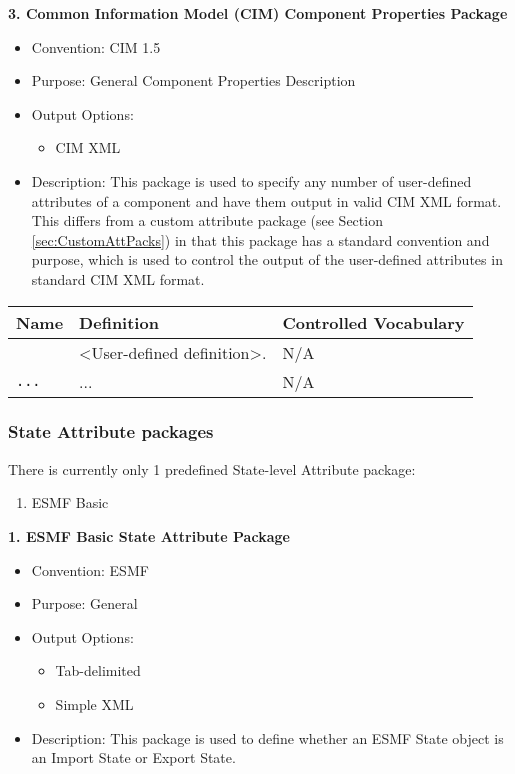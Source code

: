 \vspace{.20in}

{\bf 3. Common Information Model (CIM) Component Properties Package}

\begin{itemize}
    \item Convention: CIM 1.5
    \item Purpose: General Component Properties Description
    \item Output Options: 
    \begin{itemize}
        \item CIM XML
    \end{itemize}  
    \item Description: This package is used to specify any number of user-defined attributes of a component and have them output in valid CIM XML format.  This differs from a custom attribute package (see Section \ref{sec:CustomAttPacks}) in that this package has a standard convention and purpose, which is used to control the output of the user-defined attributes in standard CIM XML format.
\end{itemize}

\begin{tabular}{|p{7cm}|p{5cm}|p{2cm}}
     \hline\hline
     {\bf Name} & {\bf Definition} & {\bf Controlled Vocabulary}\\
     \hline\hline
     {\tt <User-defined name>} & <User-defined definition>. & N/A \\
     {\tt ...} & ... & N/A \\
     \hline\hline
\end{tabular}

\vspace{.20in}

\subsubsection{State Attribute packages}
\label{StateAttributePackages}

There is currently only 1 predefined State-level Attribute package:

\begin{enumerate}
    \item ESMF Basic
\end{enumerate}


\vspace{.20in}
{\bf 1. ESMF Basic State Attribute Package}

\begin{itemize}
    \item Convention: ESMF
    \item Purpose: General
    \item Output Options:
    \begin{itemize}
        \item Tab-delimited
        \item Simple XML 
    \end{itemize}
    \item Description: This package is used to define whether an ESMF State object is an Import State or Export State.   
\end{itemize}

